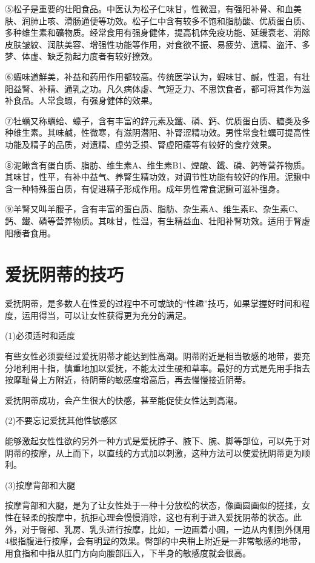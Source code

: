 \documentclass[12pt,UTF8]{ctexbook}
\begin{document}
⑤松子是重要的壮阳食品。中医认为松子仁味甘，性微温，有强阳补骨、和血美肤、润肺止咳、滑肠通便等功效。松子仁中含有较多不饱和脂肪酸、优质蛋白质、多种维生素和礦物质。经常食用有强身健体，提高机体免疫功能、延缓衰老、消除皮肤皱紋、润肤美容、增强性功能等作用，对食欲不振、易疲劳、遗精、盗汗、多梦、体虚、缺乏勃起力度者有较好撩效。

⑥蝦味道鮮美，补益和药用作用都较高。传统医学认为，蝦味甘、鹹，性温，有壮阳益腎、补精、通乳之功。凡久病体虚、气短乏力、不思饮食者，都可将其作为滋补食品。人常食蝦，有强身健体的效果。

⑦牡蠣又称蠣蛤、蠔子，含有丰富的鋅元素及鐵、磷、鈣、优质蛋白质、糖类及多种维生素。其味鹹，性微寒，有滋阴潜阳、补腎涩精功效。男性常食牡蠣可提高性功能及精子的品质，对遗精、虛劳乏损、腎虛阳痿等有较好的食疗效果。

⑧泥鳅含有蛋白质、脂肪、维生素A、维生素B1、煙酸、鐵、磷、鈣等营养物质。其味甘，性平，有补中益气、养腎生精功效，对调节性功能有较好的作用。泥鳅中含一种特殊蛋白质，有促进精子形成作用。成年男性常食泥鳅可滋补强身。

⑨羊腎又叫羊腰子，含有丰富的蛋白质、脂肪、杂生素A、维生素E、杂生素C、鈣、鐵、磷等营养物质。其味甘，性温，有生精益血、壮阳补腎功效。适用于腎虚阳痿者食用。

\section{爱抚阴蒂的技巧}

爱抚阴蒂，是多数人在性爱的过程中不可或缺的“性趣”技巧，如果掌握好时间和程度，运用得当，可以让女性获得更为充分的满足。

(1)必须适时和适度

有些女性必须要经过爱抚阴蒂才能达到性高潮。阴蒂附近是相当敏感的地带，要充分地利用十指，慎重地加以爱抚，不能太过生硬和草率。最好的方式是先用手指去按摩耻骨上方附近，待阴蒂的敏感度增高后，再去慢慢接近阴蒂。

爱抚阴蒂成功，会产生很大的快感，甚至能促使女性达到高潮。

(2)不要忘记爱抚其他性敏感区

能够激起女性性欲的另外一种方式是爱抚脖子、腋下、腕、脚等部位，可以先于对阴蒂的按摩，从上而下，以直线的方式加以刺激，这种方法可以使爱抚阴蒂更为顺利。

(3)按摩背部和大腿

按摩背部和大腿，是为了让女性处于一种十分放松的状态，像画圆画似的搓揉，女性在轻柔的按摩中，抗拒心理会慢慢消除，这也有利于进入爱抚阴蒂的状态。此外，对于臀部、乳房、乳头进行按摩，比如，一边画着小圆，一边从内侧到外侧用4根指腹进行按摩，会有明显的效果。臀部的中央稍上附近是一非常敏感的地带，用食指和中指从肛门方向向腰部压入，下半身的敏感度就会很高。
\end{document}
